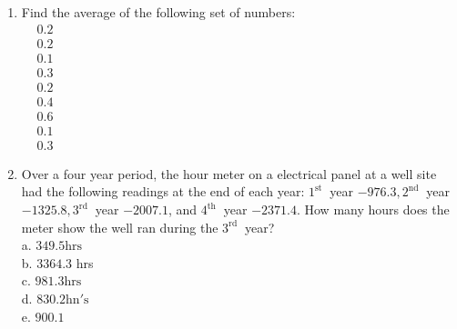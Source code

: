 \documentclass{article}
\begin{document}
\begin{enumerate}
\item Find the average of the following set of numbers:\\
$
\begin{aligned}
&0.2 \\
&0.2 \\
&0.1 \\
&0.3 \\
&0.2 \\
&0.4 \\
&0.6 \\
&0.1 \\
&0.3
\end{aligned}
$

\item Over a four year period, the hour meter on a electrical panel at a well site had the following readings at the end of each year: $1^{\text {st }}$ year $-976.3,2^{\text {nd }}$ year $-1325.8,3^{\text {rd }}$ year $-2007.1$, and $4^{\text {th }}$ year $-2371.4$. How many hours does the meter show the well ran during the $3^{\text {rd }}$ year?\\
a. $349.5 \mathrm{hrs}$\\
b. $3364.3$ hrs\\
c. $981.3 \mathrm{hrs}$\\
d.  $830.2 \mathrm{hn \prime s}$\\
e. $900.1$\\
\end{enumerate}
\end{document}
